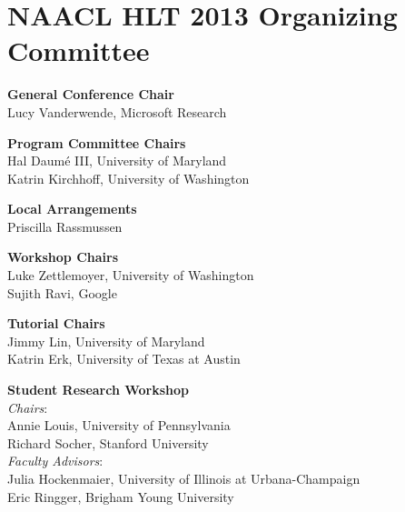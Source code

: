 \markboth{}{} %
\markright{}{} %

\section*{NAACL HLT 2013 Organizing Committee}{}

\setlength{\parindent}{0pt}

{\bf General Conference Chair} \\
Lucy Vanderwende, Microsoft Research \\

{\bf Program Committee Chairs} \\
Hal Daum\'{e} III, University of Maryland \\
Katrin Kirchhoff, University of Washington \\

{\bf Local Arrangements} \\
Priscilla Rassmussen \\

{\bf Workshop Chairs} \\
Luke Zettlemoyer, University of Washington \\
Sujith Ravi, Google \\

{\bf Tutorial Chairs} \\
Jimmy Lin, University of Maryland \\
Katrin Erk, University of Texas at Austin \\

{\bf Student Research Workshop} \\
\emph{Chairs}: \\
\hspace*{5mm} Annie Louis, University of Pennsylvania \\
\hspace*{5mm} Richard Socher, Stanford University \\
\emph{Faculty Advisors}: \\
\hspace*{5mm} Julia Hockenmaier, University of Illinois at Urbana-Champaign \\
\hspace*{5mm} Eric Ringger, Brigham Young University \\

